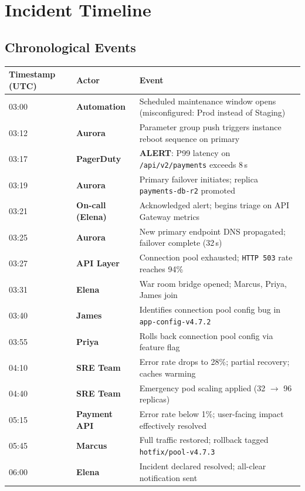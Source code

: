 \section{Incident Timeline}

\subsection{Chronological Events}

\setlength{\parskip}{0pt}
\begin{tabularx}{\linewidth}{@{}
  >{\ttfamily\small\color{muted}}l
  @{\hspace{6mm}}
  >{\small\bfseries}l
  @{\hspace{4mm}}
  >{\small\raggedright\arraybackslash}X
  @{}}
\toprule
\normalfont\small\bfseries\color{ink}Timestamp (UTC) &
\normalfont\small\bfseries\color{ink}Actor &
\normalfont\small\bfseries\color{ink}Event \\
\midrule
03:00 & Automation     & Scheduled maintenance window opens (misconfigured: Prod instead of Staging)\\
03:12 & Aurora         & Parameter group push triggers instance reboot sequence on primary\\
03:17 & PagerDuty      & \textbf{\color{accent}ALERT}: P99 latency on \texttt{/api/v2/payments} exceeds 8\,s\\
03:19 & Aurora         & Primary failover initiates; replica \texttt{payments-db-r2} promoted\\
03:21 & On-call (Elena)& Acknowledged alert; begins triage on API Gateway metrics\\
03:25 & Aurora         & New primary endpoint DNS propagated; failover complete (32\,s)\\
03:27 & API Layer      & Connection pool exhausted; \texttt{HTTP 503} rate reaches 94\%\\
03:31 & Elena          & War room bridge opened; Marcus, Priya, James join\\
03:40 & James          & Identifies connection pool config bug in \texttt{app-config-v4.7.2}\\
03:55 & Priya          & Rolls back connection pool config via feature flag\\
04:10 & SRE Team       & Error rate drops to 28\%; partial recovery; caches warming\\
04:40 & SRE Team       & Emergency pod scaling applied (32 $\to$ 96 replicas)\\
05:15 & Payment API    & Error rate below 1\%; user-facing impact effectively resolved\\
05:45 & Marcus         & Full traffic restored; rollback tagged \texttt{hotfix/pool-v4.7.3}\\
06:00 & Elena          & Incident declared resolved; all-clear notification sent\\
\bottomrule
\end{tabularx}
\setlength{\parskip}{4pt plus 1pt}

